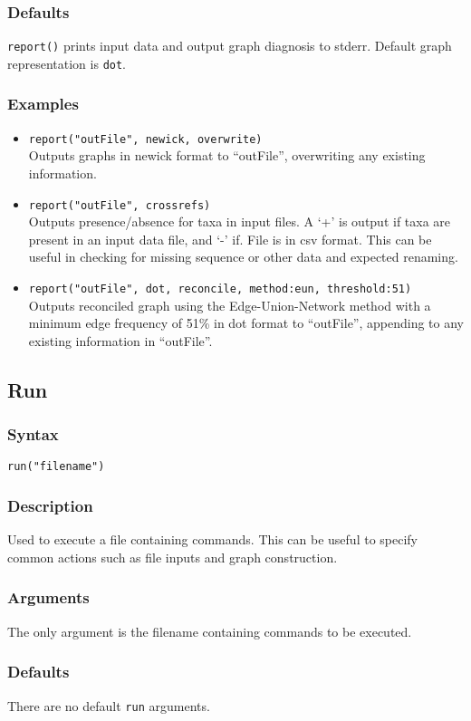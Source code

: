 \documentclass[11pt]{article}
\begin{document}
		\subsubsection{Defaults}
				\texttt{report()} prints input data and output graph diagnosis  to stderr.  Default graph representation is \texttt{dot}.
		\subsubsection{Examples}
				\begin{itemize}
					\item{\texttt{report("outFile", newick, overwrite)}\\ Outputs graphs in newick format to ``outFile'', overwriting any existing information.}
					\item{\texttt{report("outFile", crossrefs)}\\ Outputs presence/absence for taxa in input files.  A `+' is output  if taxa are present in an input data file, 
					and `-' if. File is in csv format.  This can be useful in checking for missing sequence or other data and expected renaming.}
					\item{\texttt{report("outFile", dot, reconcile, method:eun, threshold:51)}\\ Outputs reconciled graph using the Edge-Union-Network method with a minimum edge frequency of 51\% in dot format to ``outFile'', appending to any existing information in ``outFile''.}
				\end{itemize}
			
	\subsection{Run}
		\subsubsection{Syntax}
				\texttt{run("filename")}
		\subsubsection{Description}
			Used to execute a file containing commands.  This can be useful to specify common actions such
			as file inputs and graph construction. 
		\subsubsection{Arguments}
			The only argument is the filename containing commands to be executed.
		\subsubsection{Defaults}
			There are no default \texttt{run} arguments.  
\end{document}
